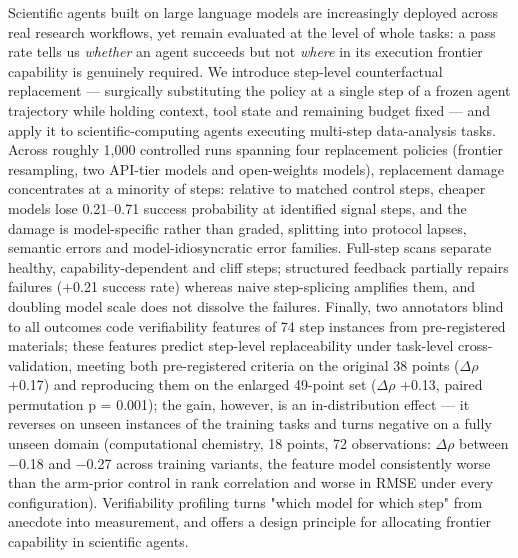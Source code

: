 Scientific agents built on large language models are increasingly deployed across real research workflows, yet remain evaluated at the level of whole tasks: a pass rate tells us \emph{whether} an agent succeeds but not \emph{where} in its execution frontier capability is genuinely required. We introduce step-level counterfactual replacement --- surgically substituting the policy at a single step of a frozen agent trajectory while holding context, tool state and remaining budget fixed --- and apply it to scientific-computing agents executing multi-step data-analysis tasks. Across roughly 1,000 controlled runs spanning four replacement policies (frontier resampling, two API-tier models and open-weights models), replacement damage concentrates at a minority of steps: relative to matched control steps, cheaper models lose 0.21--0.71 success probability at identified signal steps, and the damage is model-specific rather than graded, splitting into protocol lapses, semantic errors and model-idiosyncratic error families. Full-step scans separate healthy, capability-dependent and cliff steps; structured feedback partially repairs failures (+0.21 success rate) whereas naive step-splicing amplifies them, and doubling model scale does not dissolve the failures. Finally, two annotators blind to all outcomes code verifiability features of 74 step instances from pre-registered materials; these features predict step-level replaceability under task-level cross-validation, meeting both pre-registered criteria on the original 38 points ($\Delta$$\rho$ +0.17) and reproducing them on the enlarged 49-point set ($\Delta$$\rho$ +0.13, paired permutation p = 0.001); the gain, however, is an in-distribution effect --- it reverses on unseen instances of the training tasks and turns negative on a fully unseen domain (computational chemistry, 18 points, 72 observations: $\Delta$$\rho$ between $-$0.18 and $-$0.27 across training variants, the feature model consistently worse than the arm-prior control in rank correlation and worse in RMSE under every configuration). Verifiability profiling turns "which model for which step" from anecdote into measurement, and offers a design principle for allocating frontier capability in scientific agents.
